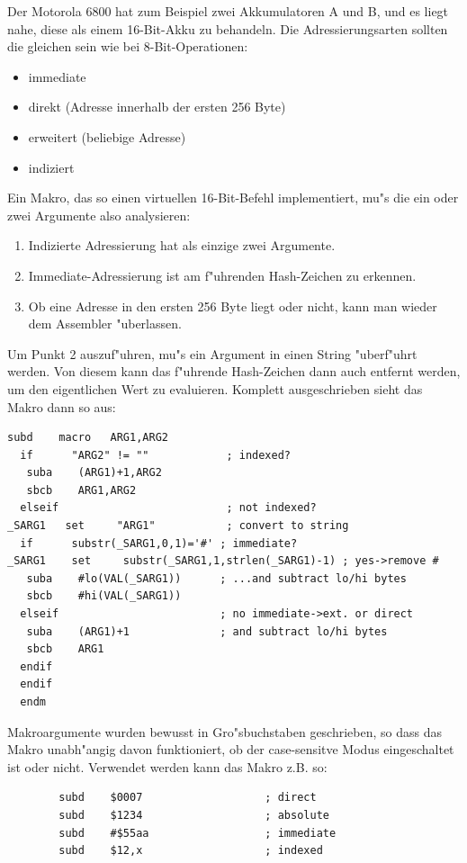 \documentclass[12pt,a4paper,twoside]{report}
\begin{document}
Der Motorola 6800 hat zum Beispiel zwei Akkumulatoren A und B, und es liegt
nahe, diese als einem 16-Bit-Akku zu behandeln.  Die Adressierungsarten
sollten die gleichen sein wie bei 8-Bit-Operationen:
\begin{itemize}
\item{immediate}
\item{direkt (Adresse innerhalb der ersten 256 Byte)}
\item{erweitert (beliebige Adresse)}
\item{indiziert}
\end{itemize}
Ein Makro, das so einen virtuellen 16-Bit-Befehl implementiert, mu"s die ein oder
zwei Argumente also analysieren:
\begin{enumerate}
\item{Indizierte Adressierung hat als einzige zwei Argumente.}
\item{Immediate-Adressierung ist am f"uhrenden Hash-Zeichen zu erkennen.}
\item{Ob eine Adresse in den ersten 256 Byte liegt oder nicht, kann man
      wieder dem Assembler "uberlassen.}
\end{enumerate}
Um Punkt 2 auszuf"uhren, mu"s ein Argument in einen String "uberf"uhrt werden.  Von
diesem kann das f"uhrende Hash-Zeichen dann auch entfernt werden, um den eigentlichen
Wert zu evaluieren.  Komplett ausgeschrieben sieht das Makro dann so aus:
\begin{verbatim}
subd    macro   ARG1,ARG2
  if      "ARG2" != ""            ; indexed?
   suba    (ARG1)+1,ARG2
   sbcb    ARG1,ARG2
  elseif                          ; not indexed?
_SARG1   set     "ARG1"           ; convert to string
  if      substr(_SARG1,0,1)='#' ; immediate?
_SARG1    set     substr(_SARG1,1,strlen(_SARG1)-1) ; yes->remove #
   suba    #lo(VAL(_SARG1))      ; ...and subtract lo/hi bytes
   sbcb    #hi(VAL(_SARG1))
  elseif                         ; no immediate->ext. or direct
   suba    (ARG1)+1              ; and subtract lo/hi bytes
   sbcb    ARG1
  endif
  endif
  endm
\end{verbatim}
Makroargumente wurden bewusst in Gro"sbuchstaben geschrieben, so dass das Makro
unabh"angig davon funktioniert, ob der case-sensitve Modus eingeschaltet ist
oder nicht.  Verwendet werden kann das Makro z.B. so:
\begin{verbatim}
        subd    $0007                   ; direct
        subd    $1234                   ; absolute
        subd    #$55aa                  ; immediate
        subd    $12,x                   ; indexed
\end{verbatim}
\end{document}
